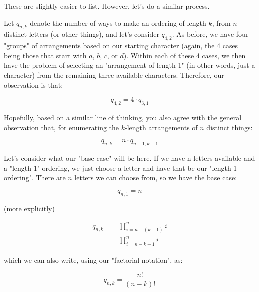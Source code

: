 These are slightly easier to list. However, let's do a similar process.

Let $q_{n,k}$ denote the number of ways to make an ordering of length $k$, from $n$ distinct letters (or other things), and let's consider $q_{4,2}$. As before, we have four "groups" of arrangements based on our starting character (again, the 4 cases being those that start with $a$, $b$, $c$, or $d$). Within each of these 4 cases, we then have the problem of selecting an "arrangement of length 1" (in other words, just a character) from the remaining three available characters. Therefore, our observation is that:

\begin{equation*}
q_{4,2} = 4 \cdot q_{3,1}
\end{equation*}

Hopefully, based on a similar line of thinking, you also agree with the general observation that, for enumerating the $k$-length arrangements of $n$ distinct things:

\begin{equation*}
q_{n,k} = n \cdot q_{n-1,k-1}
\end{equation*}

Let's consider what our "base case" will be here. If we have n letters available and a "length 1" ordering, we just choose a letter and have that be our "length-1 ordering". There are $n$ letters we can choose from, so we have the base case: 

\begin{equation*}
q_{n,1} = n
\end{equation*}



(more explicitly)

\begin{align*}
q_{n,k} &= \prod_{i=n-(k-1)}^n i \\
&= \prod_{i=n-k+1}^n i
\end{align*}


which we can also write, using our "factorial notation", as:

\begin{equation}
\label{eq:perms-n-k}
q_{n,k} = \frac{n!}{(n-k)!}
\end{equation}

